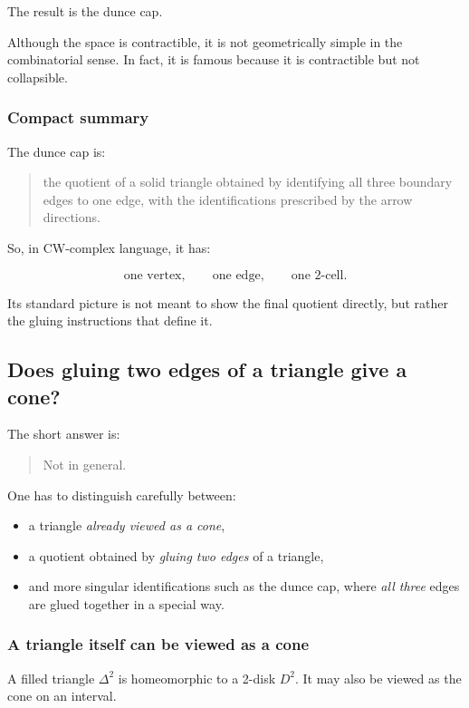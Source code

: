 \documentclass[12pt,a4paper]{article}
\theoremstyle{notespace}
\begin{document}
The result is the dunce cap.

Although the space is contractible, it is not geometrically simple in the combinatorial sense. In fact, it is famous because it is contractible but not collapsible.

\subsubsection{Compact summary}

The dunce cap is:

\begin{quote}
	the quotient of a solid triangle obtained by identifying all three boundary edges to one edge, with the identifications prescribed by the arrow directions.
\end{quote}

So, in CW-complex language, it has:

\[
\text{one vertex},\qquad
\text{one edge},\qquad
\text{one 2-cell}.
\]

Its standard picture is not meant to show the final quotient directly, but rather the gluing instructions that define it.

\subsection{Does gluing two edges of a triangle give a cone?}

The short answer is:

\begin{quote}
	Not in general.
\end{quote}

One has to distinguish carefully between:

\begin{itemize}
	\item a triangle \emph{already viewed as a cone},
	\item a quotient obtained by \emph{gluing two edges} of a triangle,
	\item and more singular identifications such as the dunce cap, where \emph{all three} edges are glued together in a special way.
\end{itemize}

\subsubsection{A triangle itself can be viewed as a cone}

A filled triangle \(\Delta^2\) is homeomorphic to a 2-disk \(D^2\). It may also be viewed as the cone on an interval.
\end{document}
